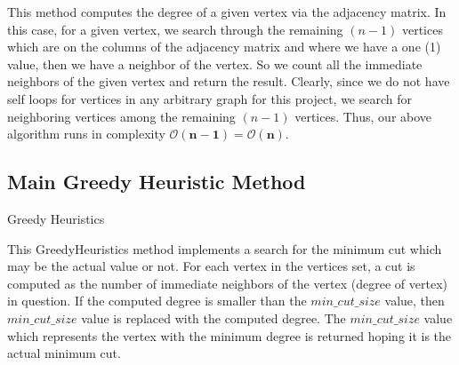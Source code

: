 \documentclass[longpaper, english, final, times]{revdetua}
\begin{document}
			This method computes the degree of a given vertex via the adjacency matrix. In this case, for a given vertex, we search through the remaining $(n-1)$ vertices which are on the columns of the adjacency matrix and where we have a one (1) value, then we have a neighbor of the vertex. So we count all the immediate neighbors of the given vertex and return the result. Clearly, since we do not have self loops for vertices in any arbitrary graph for this project, we search for neighboring vertices among the remaining $(n-1)$ vertices. Thus, our above algorithm runs in complexity $\mathbf{\mathcal{O}(n-1)}=\mathbf{\mathcal{O}(n)}$. 
		
		\subsection{Main Greedy Heuristic Method}
			\begin{algorithm}
				\caption{Greedy Heuristics}
				\label{algorithm:GreedyHeuristics}
				\DontPrintSemicolon
				
				
				
			\end{algorithm}
			
			This GreedyHeuristics method implements a search for the minimum cut which may be the actual value or not. For each vertex in the vertices set, a cut is computed as the number of immediate neighbors of the vertex (degree of vertex) in question. If the computed degree is smaller than the $min\_cut\_size$ value, then $min\_cut\_size$  value is replaced with the computed degree. The $min\_cut\_size$ value which represents the vertex with the minimum degree is returned hoping it is the actual minimum cut. \\
			
\end{document}
